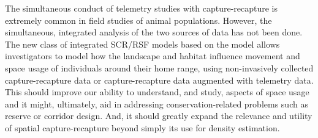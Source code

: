 The simultaneous conduct of telemetry studies with capture-recapture
is extremely common in field studies of animal populations. However,
the simultaneous, integrated analysis of the two sources of data has
not been done.  The new class of integrated SCR/RSF models based on
the \citet{royle_etal:2012mee} model allows investigators to model how
the landscape and habitat influence movement and space usage of
individuals around their home range, using non-invasively collected
capture-recapture data or capture-recapture data augmented with
telemetry data.  This should improve our ability to understand, and
study, aspects of space usage and it might, ultimately, aid in
addressing conservation-related problems such as reserve or corridor
design. And, it should greatly expand the relevance and utility of
spatial capture-recapture beyond simply its use for density
estimation.






























